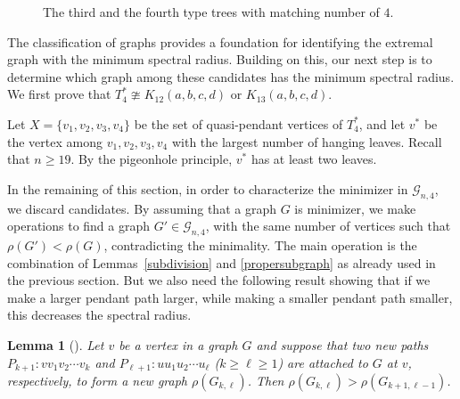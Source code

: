 \documentclass[12pt]{amsart}
\newtheorem{lem}{Lemma}[section]
\begin{document}
\begin{figure}[h!]
\vspace*{-1cm}
	\caption{The third and the fourth type  trees with matching number of $4$.}\label{fig-main-tree-6}
\end{figure}



The classification of graphs provides a foundation for identifying the extremal graph with the minimum spectral radius. 
Building on this, our next step is to determine which graph among these candidates has the minimum spectral radius. We first prove that $T_4^* \ncong K_{12}(a,b,c,d)$ or $K_{13}(a,b,c,d)$.



Let \(X = \{v_1, v_2, v_3, v_4\}\) be the set of quasi-pendant vertices of \(T_4^*\), and let \(v^*\) be the vertex among \(v_1, v_2, v_3, v_4\) with the largest number of hanging leaves. 
Recall that $n\geq 19$.
By the pigeonhole principle, \(v^*\) has at least two leaves.

	In the remaining of this section, in order to characterize the minimizer in $\mathcal{G}_{n,4}$, we discard candidates. By assuming that a graph $G$ is minimizer, we make operations to find a graph $G'\in \mathcal{G}_{n,4}$, with the same number of vertices  such that $\rho(G') < \rho(G)$, contradicting the minimality. The main operation is the combination of Lemmas~\ref{subdivision} and \ref{propersubgraph} as already used in the previous section. But we also need the following result showing that if we make a larger pendant path larger, while making a smaller pendant path smaller, this decreases the spectral radius.



\begin{lem}[\cite{LiFeng1979}]\label{lem-2-1}
	Let $v$ be a vertex in a graph $G$ and suppose that two new paths 
	$P_{k+1}: vv_1v_2\cdots v_k$ and $P_{\ell+1}:uu_1u_2\cdots u_\ell$ ($k\geq \ell\geq 1$) are  attached to $G$ at $v$, respectively, to form a new graph $\rho(G_{k,\ell})$. Then
	$\rho(G_{k,\ell})>\rho(G_{k+1,\ell-1})$.
\end{lem}
\end{document}
